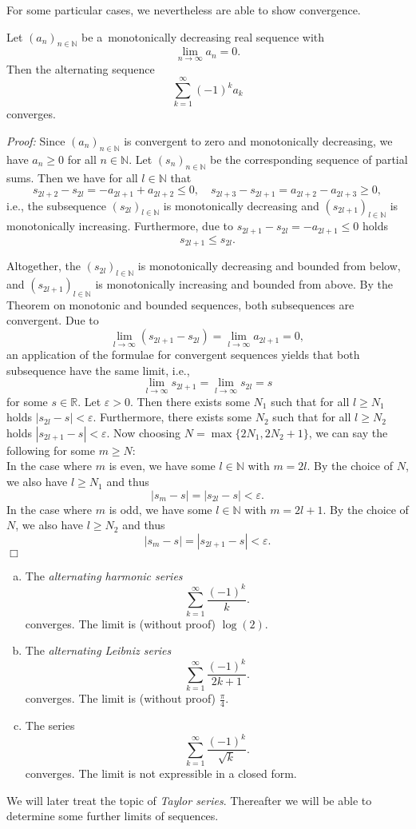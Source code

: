  

For some particular cases, we nevertheless are able to show convergence.
\begin{Theorem}
\label{th:Leibnizcrit}
Let $(a_n)_{n\in\mathbb{N}}$ be a~monotonically decreasing real sequence with
\[\lim_{n\to\infty}a_n=0.\]
Then the alternating sequence
\[\sum_{k=1}^\infty (-1)^ka_k\]
converges.
\end{Theorem}
{\em Proof:} Since $(a_n)_{n\in\mathbb{N}}$ is convergent to zero and monotonically decreasing, we have $a_n\geq0$ for all $n\in\mathbb{N}$. Let $(s_n)_{n\in\mathbb{N}}$ be the corresponding sequence of partial sums.
Then we have for all $l\in \mathbb{N}$ that
\[s_{2l+2}-s_{2l}=-a_{2l+1}+a_{2l+2}\leq 0,\quad s_{2l+3}-s_{2l+1}=a_{2l+2}-a_{2l+3}\geq 0,\]
i.e., the subsequence $(s_{2l})_{l\in\mathbb{N}}$ is monotonically decreasing and $(s_{2l+1})_{l\in\mathbb{N}}$ is monotonically increasing. Furthermore, due to $s_{2l+1}-s_{2l}=-a_{2l+1}\leq0$ holds
\[s_{2l+1}\leq s_{2l}.\]

Altogether, the $(s_{2l})_{l\in\mathbb{N}}$ is monotonically decreasing and bounded from below, and $(s_{2l+1})_{l\in\mathbb{N}}$ is monotonically increasing and bounded from above.
By the Theorem on monotonic and bounded sequences, both subsequences are convergent. Due to
\[\lim_{l\to\infty}(s_{2l+1}-s_{2l})=\lim_{l\to\infty}a_{2l+1}=0,\]
an application of the formulae for convergent sequences yields that both subsequence have the same limit, i.e.,
\[\lim_{l\to\infty}s_{2l+1}=\lim_{l\to\infty}s_{2l}=s\]
for some $s\in\mathbb{R}$. Let $\varepsilon>0$. Then there exists some $N_1$ such that for all $l\geq N_1$ holds $|s_{2l}-s|<\varepsilon$. Furthermore, there exists some $N_2$ such that for all $l\geq N_2$ holds $|s_{2l+1}-s|<\varepsilon$. Now choosing $N=\max\{2N_1,2N_2+1\}$, we can say the following for some $m\geq N$:\\
In the case where $m$ is even, we have some $l\in\mathbb{N}$ with $m=2l$. By the choice of $N$, we also have $l\geq N_1$ and thus
\[|s_{m}-s|=|s_{2l}-s|<\varepsilon.\]
In the case where $m$ is odd, we have some $l\in\mathbb{N}$ with $m=2l+1$. By the choice of $N$, we also have $l\geq N_2$ and thus
\[|s_{m}-s|=|s_{2l+1}-s|<\varepsilon.\]
\hfill$\Box$

\begin{example}\label{ex:leib}
\begin{enumerate}[(a)]
 \item  The {\em alternating harmonic series}
\[\sum_{k=1}^\infty \frac{(-1)^k}{k}.\]
converges. The limit is (without proof) $\log(2)$.
 \item  The {\em alternating Leibniz series}
\[\sum_{k=1}^\infty \frac{(-1)^k}{2k+1}.\]
converges. The limit is (without proof) $\frac\pi4$.
 \item  The series
\[\sum_{k=1}^\infty \frac{(-1)^k}{\sqrt{k}}.\]
converges. The limit is not expressible in a closed form.
\end{enumerate}
\end{example}
We will later treat the topic of {\em Taylor series}. Thereafter we will be able to determine some further limits of sequences.

